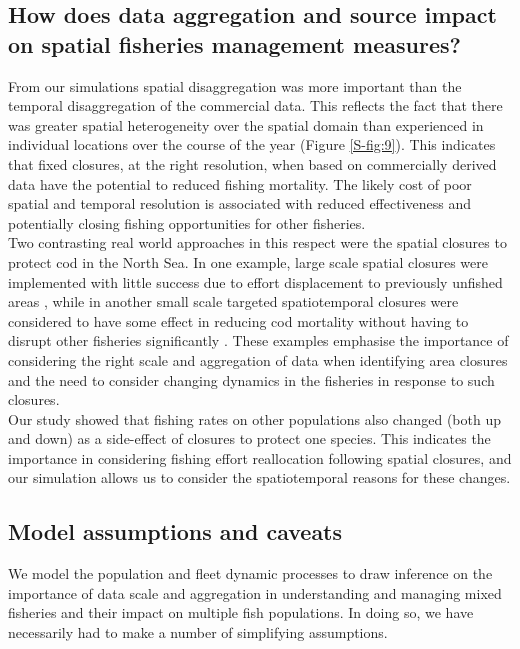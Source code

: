\documentclass[review]{elsarticle}
\begin{document}
\subsection{How does data aggregation and source impact on spatial fisheries
	management measures?}

From our simulations spatial disaggregation was more important than the
temporal disaggregation of the commercial data. This reflects the fact that
there was greater spatial heterogeneity over the spatial domain than
experienced in individual locations over the course of the year (Figure
\ref{S-fig:9}). This indicates that fixed closures, at the right resolution,
when based on commercially derived data have the potential to reduced fishing
mortality. The likely cost of poor spatial and temporal resolution is
associated with reduced effectiveness and potentially closing fishing
opportunities for other fisheries. \\

Two contrasting real world approaches in this respect were the spatial closures
to protect cod in the North Sea. In one example, large scale spatial closures
were implemented with little success due to effort displacement to previously
unfished areas \citep{Dinmore2003}, while in another small scale targeted
spatiotemporal closures were considered to have some effect in reducing cod
mortality without having to disrupt other fisheries significantly
\citep{Needle2011}. These examples emphasise the importance of considering the
right scale and aggregation of data when identifying area closures and the need
to consider changing dynamics in the fisheries in response to such closures. \\

Our study showed that fishing rates on other populations also changed (both up
and down) as a side-effect of closures to protect one species.  This indicates
the importance in considering fishing effort reallocation following spatial
closures, and our simulation allows us to consider the spatiotemporal reasons
for these changes.

\subsection{Model assumptions and caveats}

We model the population and fleet dynamic processes to draw inference on the
importance of data scale and aggregation in understanding and managing mixed
fisheries and their impact on multiple fish populations. In doing so, we have
necessarily had to make a number of simplifying assumptions. \\
\end{document}

